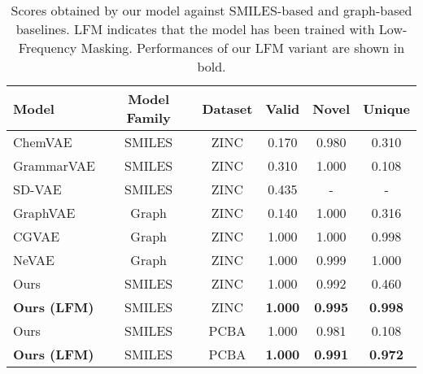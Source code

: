 \begin{table}[h!]
    \begin{center}
    \caption{Scores obtained by our model against SMILES-based and graph-based baselines. LFM indicates that the model has been trained with Low-Frequency Masking. Performances of our LFM variant are shown in bold.}\label{tab:aistats-results}
    \renewcommand{\arraystretch}{1.2}
    \begin{tabular}{lccccc}
        \toprule
        \textbf{Model} & \textbf{Model Family} & \textbf{Dataset} & \textbf{Valid} & \textbf{Novel} & \textbf{Unique}\\
        \midrule
        ChemVAE     & SMILES    & ZINC & 0.170 & 0.980 & 0.310\\
        GrammarVAE  & SMILES    & ZINC & 0.310 & 1.000 & 0.108\\
        SD-VAE      & SMILES    & ZINC & 0.435 &     - &     -\\
        GraphVAE    & Graph & ZINC & 0.140 & 1.000 & 0.316\\
        CGVAE       & Graph & ZINC & 1.000 & 1.000 & 0.998\\
        NeVAE       & Graph & ZINC & 1.000 & 0.999 & 1.000\\
        \midrule
        Ours        & SMILES    & ZINC & 1.000 & 0.992 & 0.460\\
        \textbf{Ours (LFM)}  & SMILES    & ZINC & \textbf{1.000} & \textbf{0.995} & \textbf{0.998}\\
        \midrule
        Ours        & SMILES    & PCBA & 1.000 & 0.981 & 0.108\\
        \textbf{Ours  (LFM)} & SMILES  & PCBA & \textbf{1.000} & \textbf{0.991} & \textbf{0.972}\\
        \bottomrule
    \end{tabular}
    \end{center}
    \end{table}